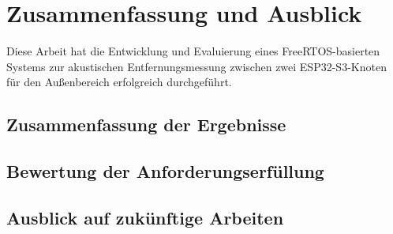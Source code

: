 \section{Zusammenfassung und Ausblick}

Diese Arbeit hat die Entwicklung und Evaluierung eines FreeRTOS-basierten Systems zur akustischen Entfernungsmessung zwischen zwei ESP32-S3-Knoten für den Außenbereich erfolgreich durchgeführt.

\subsection{Zusammenfassung der Ergebnisse}



\subsection{Bewertung der Anforderungserfüllung}



\subsection{Ausblick auf zukünftige Arbeiten}

